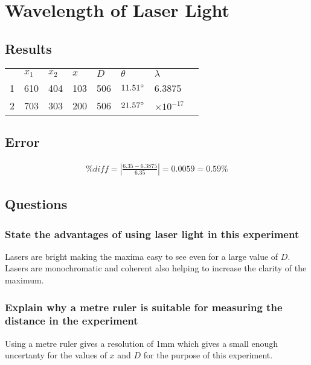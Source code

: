 \documentclass{article}
\begin{document}
\break

\section{Wavelength of Laser Light}

\subsection{Results}

\begin{center}
\begin{tabular}{l|l|l|l|l|l|ll}
  & $x_1$ & $x_2$ & $x$ & $D$ & $\theta$        & $\lambda$         & \\ \cline{1-7}
1 & 610   & 404   & 103 & 506 & $11.51 \degree$ & 6.3875            & \\
2 & 703   & 303   & 200 & 506 & $21.57 \degree$ & $\times 10^{-17}$ &
\end{tabular}
\end{center}

\subsection{Error}

\begin{gather}
	\%diff = \left | \frac{6.35 - 6.3875}{6.35} \right | = 0.0059 = 0.59 \%
\end{gather}

\subsection{Questions}

\subsubsection{State the advantages of using laser light in this experiment}
Lasers are bright making the maxima easy to see even for a large value of $D$.
Lasers are monochromatic and coherent also helping to increase the clarity of
the maximum.

\subsubsection{Explain why a metre ruler is suitable for measuring the distance
	in the experiment}
Using a metre ruler gives a resolution of 1\si{mm} which gives a small enough
uncertanty for the values of $x$ and $D$ for the purpose of this experiment.
\end{document}
